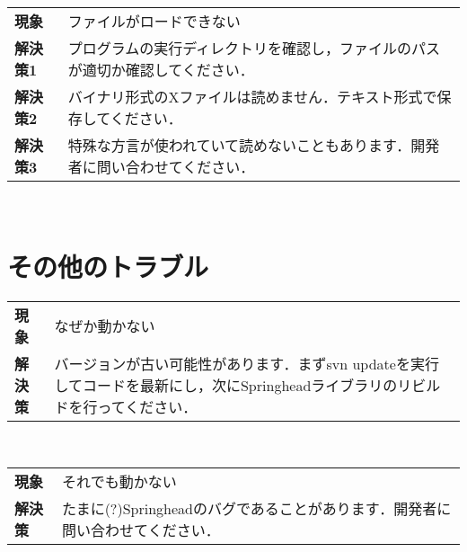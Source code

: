 \noindent
\begin{tabular}{p{15mm}p{110mm}}
\textbf{現象} & ファイルがロードできない\\
\textbf{解決策1} & プログラムの実行ディレクトリを確認し，ファイルのパスが適切か確認してください．\\
\textbf{解決策2} & バイナリ形式のXファイルは読めません．テキスト形式で保存してください．\\
\textbf{解決策3} & 特殊な方言が使われていて読めないこともあります．開発者に問い合わせてください．
\end{tabular}
\vspace{2mm}\\

\section{その他のトラブル}

\noindent
\begin{tabular}{p{10mm}p{110mm}}
\textbf{現象} &  なぜか動かない\\
\textbf{解決策} & バージョンが古い可能性があります．まずsvn updateを実行してコードを最新にし，次にSpringheadライブラリのリビルドを行ってください．
\end{tabular}
\vspace{2mm}\\
\begin{tabular}{p{10mm}p{110mm}}
\textbf{現象} &  それでも動かない\\
\textbf{解決策} & たまに(?)Springheadのバグであることがあります．開発者に問い合わせてください．
\end{tabular}
\vspace{2mm}\\


